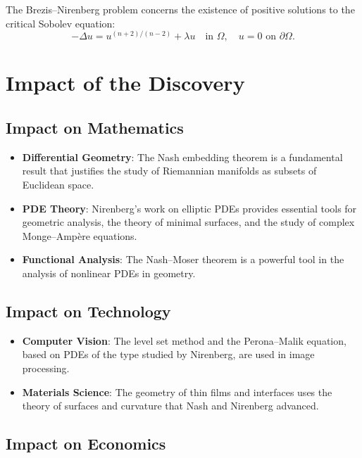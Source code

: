 The Brezis--Nirenberg problem concerns the existence of positive solutions to the critical Sobolev equation:
\[
-\Delta u = u^{(n+2)/(n-2)} + \lambda u \quad \text{in } \Omega, \quad u = 0 \text{ on } \partial\Omega.
\]

\section{Impact of the Discovery}

\subsection{Impact on Mathematics}

\begin{itemize}
\item \textbf{Differential Geometry}: The Nash embedding theorem is a fundamental result that justifies the study of Riemannian manifolds as subsets of Euclidean space.

\item \textbf{PDE Theory}: Nirenberg's work on elliptic PDEs provides essential tools for geometric analysis, the theory of minimal surfaces, and the study of complex Monge--Amp\`ere equations.

\item \textbf{Functional Analysis}: The Nash--Moser theorem is a powerful tool in the analysis of nonlinear PDEs in geometry.

\end{itemize}

\subsection{Impact on Technology}

\begin{itemize}
\item \textbf{Computer Vision}: The level set method and the Perona--Malik equation, based on PDEs of the type studied by Nirenberg, are used in image processing.

\item \textbf{Materials Science}: The geometry of thin films and interfaces uses the theory of surfaces and curvature that Nash and Nirenberg advanced.

\end{itemize}

\subsection{Impact on Economics}

